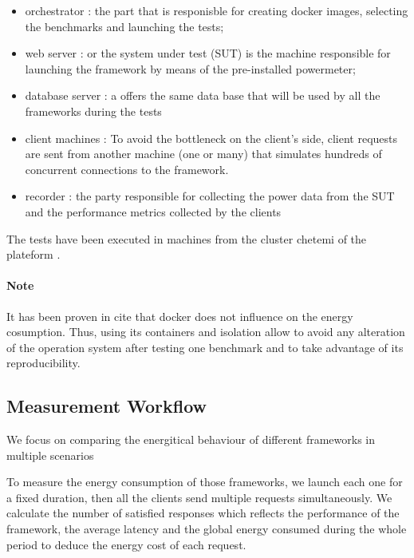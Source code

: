 \begin{itemize}
    \item orchestrator : the part that is responisble for creating docker images, selecting the benchmarks and launching the tests;
    \item web server : or the system under test (SUT) is the machine  responsible for launching the framework  by means of the pre-installed powermeter;
    \item database server : a offers the same data base that will be used by all the frameworks during the tests
    \item client machines : To avoid the bottleneck on the client's side, client requests are sent from another machine (one or many) that simulates hundreds of concurrent connections to the framework.
    \item recorder : the party responsible for collecting the power data from the SUT and the performance metrics collected by the clients 
\end{itemize}

The tests have been executed in machines from the cluster chetemi of the  plateform .

\paragraph{Note}
It has been proven in {cite } that docker does not influence on the energy cosumption. Thus, using its containers and isolation allow to avoid any alteration of the operation system after testing one benchmark and to take advantage of its reproducibility.

\subsection{Measurement Workflow}
We focus on comparing the energitical behaviour of different frameworks in multiple scenarios

To measure the energy consumption of those frameworks, we launch each one for a fixed duration, then all the clients send multiple requests simultaneously.
We calculate %
the number of satisfied responses which reflects the performance of the framework, the average latency and the global energy consumed during the whole period to deduce the energy cost of each request.


